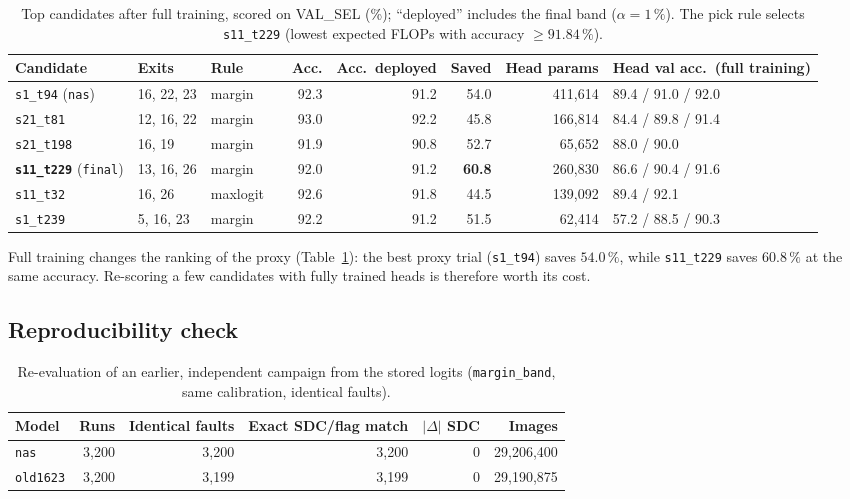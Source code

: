 \documentclass[10pt,a4paper]{article}
\newcommand{\meth}[1]{\texttt{#1}}
\newcommand{\ours}{\meth{margin\_band}}
\begin{document}
\begin{table}[H]
\centering\small
\setlength{\tabcolsep}{4pt}
\caption{Top candidates after full training, scored on VAL\_SEL (\%); ``deployed'' includes the final band
($\alpha=1\,\%$). The pick rule selects \meth{s11\_t229} (lowest expected FLOPs with accuracy $\ge91.84\,\%$).}
\label{tab:top5}
\begin{adjustbox}{max width=\linewidth}
\begin{tabular}{@{}llllrrrrl@{}}
\toprule
Candidate & Exits & Rule & & Acc. & Acc.\ deployed & Saved & Head params & Head val acc.\ (full training) \\
\midrule
\meth{s1\_t94} (\meth{nas}) & 16, 22, 23 & margin  & & 92.3 & 91.2 & 54.0 & 411{,}614 & 89.4 / 91.0 / 92.0 \\
\meth{s21\_t81}             & 12, 16, 22 & margin  & & 93.0 & 92.2 & 45.8 & 166{,}814 & 84.4 / 89.8 / 91.4 \\
\meth{s21\_t198}            & 16, 19     & margin  & & 91.9 & 90.8 & 52.7 & 65{,}652  & 88.0 / 90.0 \\
\textbf{\meth{s11\_t229}} (\meth{final}) & 13, 16, 26 & margin & & 92.0 & 91.2 & \textbf{60.8} & 260{,}830 & 86.6 / 90.4 / 91.6 \\
\meth{s11\_t32}             & 16, 26     & maxlogit & & 92.6 & 91.8 & 44.5 & 139{,}092 & 89.4 / 92.1 \\
\meth{s1\_t239}             & 5, 16, 23  & margin  & & 92.2 & 91.2 & 51.5 & 62{,}414  & 57.2 / 88.5 / 90.3 \\
\bottomrule
\end{tabular}
\end{adjustbox}
\end{table}

Full training changes the ranking of the proxy (Table~\ref{tab:top5}): the best proxy trial (\meth{s1\_t94})
saves $54.0\,\%$, while \meth{s11\_t229} saves $60.8\,\%$ at the same accuracy. Re-scoring a few candidates with
fully trained heads is therefore worth its cost.

\subsection{Reproducibility check}

\begin{table}[H]
\centering\small
\caption{Re-evaluation of an earlier, independent campaign from the stored logits (\ours, same calibration,
identical faults).}
\label{tab:repro}
\begin{adjustbox}{max width=\linewidth}
\begin{tabular}{@{}lrrrrr@{}}
\toprule
Model & Runs & Identical faults & Exact SDC/flag match & $|\Delta|$ SDC & Images \\
\midrule
\meth{nas}     & 3{,}200 & 3{,}200 & 3{,}200 & 0 & 29{,}206{,}400 \\
\meth{old1623} & 3{,}200 & 3{,}199 & 3{,}199 & 0 & 29{,}190{,}875 \\
\bottomrule
\end{tabular}
\end{adjustbox}
\end{table}
\end{document}
